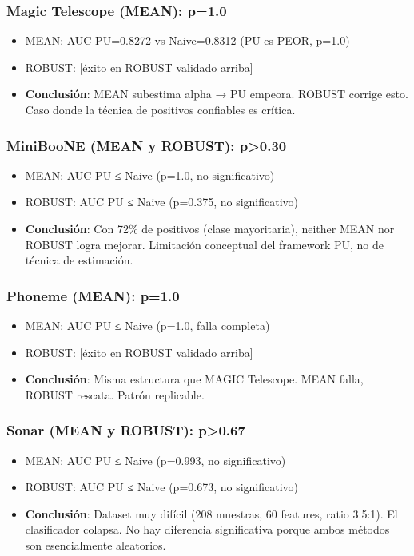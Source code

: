 \documentclass[a4paper,11pt]{article}
\begin{document}
\subsubsection{Magic Telescope (MEAN): p=1.0}
\begin{itemize}
    \item MEAN: AUC PU=0.8272 vs Naive=0.8312 (PU es PEOR, p=1.0)
    \item ROBUST: [éxito en ROBUST validado arriba]
    \item \textbf{Conclusión}: MEAN subestima alpha → PU empeora. ROBUST corrige esto. Caso donde la técnica de positivos confiables es crítica.
\end{itemize}

\subsubsection{MiniBooNE (MEAN y ROBUST): p>0.30}
\begin{itemize}
    \item MEAN: AUC PU ≤ Naive (p=1.0, no significativo)
    \item ROBUST: AUC PU ≤ Naive (p=0.375, no significativo)
    \item \textbf{Conclusión}: Con 72\% de positivos (clase mayoritaria), neither MEAN nor ROBUST logra mejorar. Limitación conceptual del framework PU, no de técnica de estimación.
\end{itemize}

\subsubsection{Phoneme (MEAN): p=1.0}
\begin{itemize}
    \item MEAN: AUC PU ≤ Naive (p=1.0, falla completa)
    \item ROBUST: [éxito en ROBUST validado arriba]
    \item \textbf{Conclusión}: Misma estructura que MAGIC Telescope. MEAN falla, ROBUST rescata. Patrón replicable.
\end{itemize}

\subsubsection{Sonar (MEAN y ROBUST): p>0.67}
\begin{itemize}
    \item MEAN: AUC PU ≤ Naive (p=0.993, no significativo)
    \item ROBUST: AUC PU ≤ Naive (p=0.673, no significativo)
    \item \textbf{Conclusión}: Dataset muy difícil (208 muestras, 60 features, ratio 3.5:1). El clasificador colapsa. No hay diferencia significativa porque ambos métodos son esencialmente aleatorios.
\end{itemize}
\end{document}
